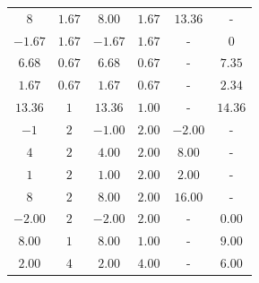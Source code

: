 \documentclass[
	spanish,
	8pt,
	utf8,
	xcolor=table,
	handout,
	aspectratio=169,
	professionalfonts,
	mathserif,
	leqno,
]{beamer}
\begin{document}
\begin{frame}
\begin{minipage}{0.6\textwidth}
\begin{table}[ht!]
\begin{tabular}{|cccccc|}
				$8$                                                                                                   & $1.67$                            & $8.00$  & $1.67$   & $13.36$  & -       \\
				$-1.67$                                                                                               & $1.67$                            & $-1.67$ & $1.67$   & -        & $0$     \\
				$6.68$                                                                                                & $0.67$                            & $6.68$  & $0.67$   & -        & $7.35$  \\
				$1.67$                                                                                                & $0.67$                            & $1.67$  & $0.67$   & -        & $2.34$  \\
				$13.36$                                                                                               & $1$                               & $13.36$ & $1.00$   & -        & $14.36$ \\
				$-1$                                                                                                  & $2$                               & $-1.00$ & $2.00$   & $-2.00$  & -       \\
				$4$                                                                                                   & $2$                               & $4.00$  & $2.00$   & $8.00$   & -       \\
				$1$                                                                                                   & $2$                               & $1.00$  & $2.00$   & $2.00$   & -       \\
				$8$                                                                                                   & $2$                               & $8.00$  & $2.00$   & $16.00$  & -       \\
				$-2.00$                                                                                               & $2$                               & $-2.00$ & $2.00$   & -        & $0.00$  \\
				$8.00$                                                                                                & $1$                               & $8.00$  & $1.00$   & -        & $9.00$  \\
				$2.00$                                                                                                & $4$                               & $2.00$  & $4.00$   & -        & $6.00$  \\

\end{tabular}
\end{table}
\end{minipage}
\end{frame}
\end{document}
